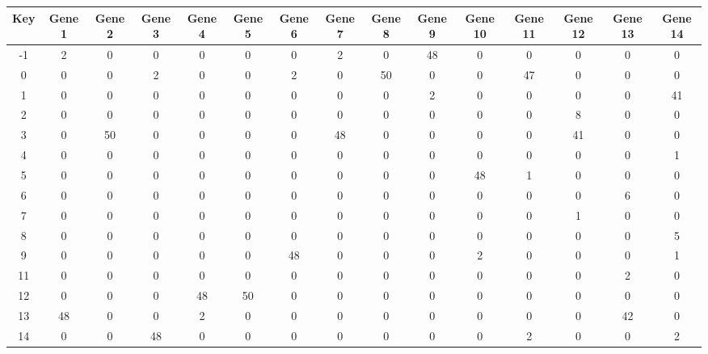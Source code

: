 \begin{tabular}{|c|c|c|c|c|c|c|c|c|c|c|c|c|c|c|}
\hline
Key & Gene 1 & Gene 2 & Gene 3 & Gene 4 & Gene 5 & Gene 6 & Gene 7 & Gene 8 & Gene 9 & Gene 10 & Gene 11 & Gene 12 & Gene 13 & Gene 14 \\
\hline
-1 & 2 & 0 & 0 & 0 & 0 & 0 & 2 & 0 & 48 & 0 & 0 & 0 & 0 & 0 \\
0 & 0 & 0 & 2 & 0 & 0 & 2 & 0 & 50 & 0 & 0 & 47 & 0 & 0 & 0 \\
1 & 0 & 0 & 0 & 0 & 0 & 0 & 0 & 0 & 2 & 0 & 0 & 0 & 0 & 41 \\
2 & 0 & 0 & 0 & 0 & 0 & 0 & 0 & 0 & 0 & 0 & 0 & 8 & 0 & 0 \\
3 & 0 & 50 & 0 & 0 & 0 & 0 & 48 & 0 & 0 & 0 & 0 & 41 & 0 & 0 \\
4 & 0 & 0 & 0 & 0 & 0 & 0 & 0 & 0 & 0 & 0 & 0 & 0 & 0 & 1 \\
5 & 0 & 0 & 0 & 0 & 0 & 0 & 0 & 0 & 0 & 48 & 1 & 0 & 0 & 0 \\
6 & 0 & 0 & 0 & 0 & 0 & 0 & 0 & 0 & 0 & 0 & 0 & 0 & 6 & 0 \\
7 & 0 & 0 & 0 & 0 & 0 & 0 & 0 & 0 & 0 & 0 & 0 & 1 & 0 & 0 \\
8 & 0 & 0 & 0 & 0 & 0 & 0 & 0 & 0 & 0 & 0 & 0 & 0 & 0 & 5 \\
9 & 0 & 0 & 0 & 0 & 0 & 48 & 0 & 0 & 0 & 2 & 0 & 0 & 0 & 1 \\
11 & 0 & 0 & 0 & 0 & 0 & 0 & 0 & 0 & 0 & 0 & 0 & 0 & 2 & 0 \\
12 & 0 & 0 & 0 & 48 & 50 & 0 & 0 & 0 & 0 & 0 & 0 & 0 & 0 & 0 \\
13 & 48 & 0 & 0 & 2 & 0 & 0 & 0 & 0 & 0 & 0 & 0 & 0 & 42 & 0 \\
14 & 0 & 0 & 48 & 0 & 0 & 0 & 0 & 0 & 0 & 0 & 2 & 0 & 0 & 2 \\
\hline
\end{tabular}
